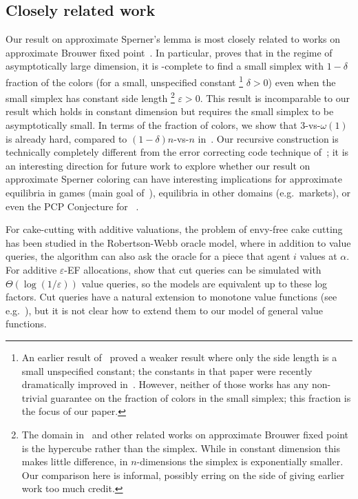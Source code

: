\documentclass[letterpaper,11pt]{article}
\begin{document}
\subsection{Closely related work}

Our result on approximate Sperner's lemma is most closely related to works on approximate Brouwer fixed point~\cite{DBLP:journals/jc/HirschPV89, DBLP:journals/siamcomp/Rubinstein18, DBLP:conf/innovations/BabichenkoPR16, DBLP:conf/focs/Rubinstein16, DBLP:journals/siamcomp/FilosRatsikasHSZ23}. In particular, \cite{DBLP:conf/focs/Rubinstein16} proves that in the regime of asymptotically large dimension, it is \PPAD-complete to find a small simplex with $1-\delta$ fraction of the colors (for a small, unspecified constant%
\footnote{An earlier result of~\cite{DBLP:journals/siamcomp/Rubinstein18} proved a weaker result where only the side length is a small unspecified constant; the constants in that paper were recently dramatically improved in~\cite{DBLP:journals/siamcomp/FilosRatsikasHSZ23}. However, neither of those works has any non-trivial guarantee on the fraction of colors in the small simplex; this fraction is the focus of our paper.}
$\delta > 0$) even when the small simplex has constant side length%
\footnote{The domain in~\cite{DBLP:conf/focs/Rubinstein16} and other related works on approximate Brouwer fixed point is the hypercube rather than the simplex. While in constant dimension this makes little difference, in $n$-dimensions the simplex is exponentially smaller. Our comparison here is informal, possibly erring on the side of giving earlier work too much credit.}
$\varepsilon >0$.  
This result is incomparable to our result which holds in constant dimension but requires the small simplex to be asymptotically small. In terms of the fraction of colors, we show that $3$-vs-$\omega(1)$ is already hard, compared to $(1-\delta)n$-vs-$n$ in~\cite{DBLP:conf/focs/Rubinstein16}. Our recursive construction is technically completely different from the error correcting code technique of~\cite{DBLP:conf/focs/Rubinstein16}; it is an interesting direction for future work to explore whether our result on approximate Sperner coloring can have interesting implications for approximate equilibria in games (main goal of~\cite{DBLP:conf/focs/Rubinstein16}), equilibria in other domains (e.g.~markets),  or even the PCP Conjecture for \PPAD~\cite{DBLP:conf/innovations/BabichenkoPR16}. 


For cake-cutting with additive valuations, the problem of envy-free cake cutting has been studied in the Robertson-Webb oracle model, where in addition to value queries, the algorithm can also ask the oracle for a piece that agent $i$ values at $\alpha$. 
For additive $\varepsilon$-EF allocations, \cite{DBLP:conf/nips/BranzeiN22} show that cut queries can be simulated with $\Theta(\log(1/\varepsilon))$ value queries, so the models are equivalent up to these log factors. Cut queries have a natural extension to monotone value functions (see e.g.~\cite{DBLP:conf/focs/HollenderR23}), but it is not clear how to extend them to our model of general value functions.
\end{document}
